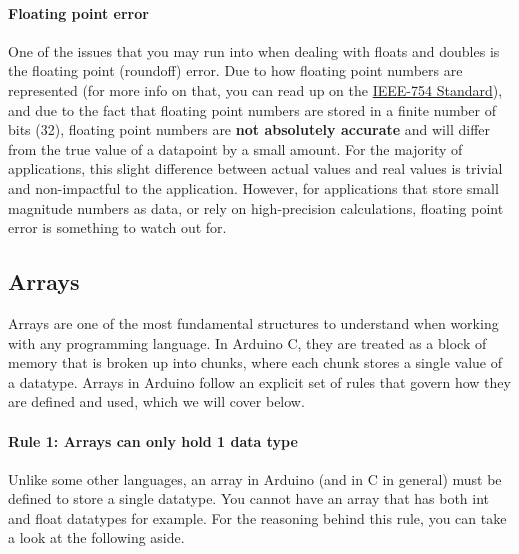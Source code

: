     \paragraph*{Floating point error} One of the issues that you may run into when dealing with floats and doubles is the floating point (roundoff) error. Due to how floating point numbers are represented
    (for more info on that, you can read up on the \href{https://en.wikipedia.org/wiki/IEEE_754}{IEEE-754 Standard}), and due to the fact that floating point numbers are stored in a finite number of bits (32),
    floating point numbers are \textbf{not absolutely accurate} and will differ from the true value of a datapoint by a small amount. For the majority of applications, this slight difference between 
    actual values and real values is trivial and non-impactful to the application. However, for applications that store small magnitude numbers as data, or rely on high-precision calculations, floating
    point error is something to watch out for.
    
    \subsection{Arrays}
    Arrays are one of the most fundamental structures to understand when working with any programming language. In Arduino C, they are treated as a block of memory that is broken up into chunks, where each
    chunk stores a single value of a datatype. Arrays in Arduino follow an explicit set of rules that govern how they are defined and used, which we will cover below.
    \paragraph*{Rule 1: Arrays can only hold 1 data type} Unlike some other languages, an array in Arduino (and in C in general) must be defined to store a single datatype. You cannot have an array that has
    both int and float datatypes for example. For the reasoning behind this rule, you can take a look at the following aside.
